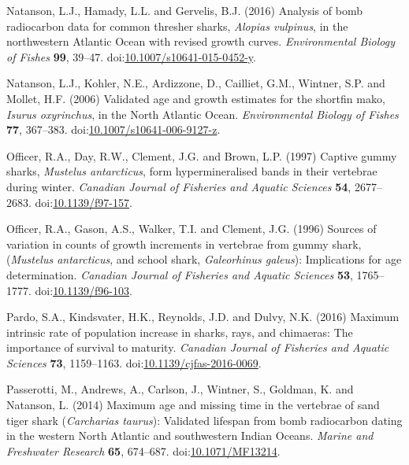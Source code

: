 \documentclass[]{article}
\begin{document}
\hypertarget{ref-natanson_analysis_2016}{}
Natanson, L.J., Hamady, L.L. and Gervelis, B.J. (2016) Analysis of bomb
radiocarbon data for common thresher sharks, \emph{Alopias vulpinus}, in
the northwestern Atlantic Ocean with revised growth curves.
\emph{Environmental Biology of Fishes} \textbf{99}, 39--47.
doi:\href{https://doi.org/10.1007/s10641-015-0452-y}{10.1007/s10641-015-0452-y}.

\hypertarget{ref-natanson_validated_2006}{}
Natanson, L.J., Kohler, N.E., Ardizzone, D., Cailliet, G.M., Wintner,
S.P. and Mollet, H.F. (2006) Validated age and growth estimates for the
shortfin mako, \emph{Isurus oxyrinchus}, in the North Atlantic Ocean.
\emph{Environmental Biology of Fishes} \textbf{77}, 367--383.
doi:\href{https://doi.org/10.1007/s10641-006-9127-z}{10.1007/s10641-006-9127-z}.

\hypertarget{ref-officer_captive_1997}{}
Officer, R.A., Day, R.W., Clement, J.G. and Brown, L.P. (1997) Captive
gummy sharks, \emph{Mustelus antarcticus}, form hypermineralised bands
in their vertebrae during winter. \emph{Canadian Journal of Fisheries
and Aquatic Sciences} \textbf{54}, 2677--2683.
doi:\href{https://doi.org/10.1139/f97-157}{10.1139/f97-157}.

\hypertarget{ref-officer_sources_1996}{}
Officer, R.A., Gason, A.S., Walker, T.I. and Clement, J.G. (1996)
Sources of variation in counts of growth increments in vertebrae from
gummy shark,(\emph{Mustelus antarcticus}, and school shark,
\emph{Galeorhinus galeus}): Implications for age determination.
\emph{Canadian Journal of Fisheries and Aquatic Sciences} \textbf{53},
1765--1777. doi:\href{https://doi.org/10.1139/f96-103}{10.1139/f96-103}.

\hypertarget{ref-pardo_maximum_2016}{}
Pardo, S.A., Kindsvater, H.K., Reynolds, J.D. and Dulvy, N.K. (2016)
Maximum intrinsic rate of population increase in sharks, rays, and
chimaeras: The importance of survival to maturity. \emph{Canadian
Journal of Fisheries and Aquatic Sciences} \textbf{73}, 1159--1163.
doi:\href{https://doi.org/10.1139/cjfas-2016-0069}{10.1139/cjfas-2016-0069}.

\hypertarget{ref-passerotti_maximum_2014}{}
Passerotti, M., Andrews, A., Carlson, J., Wintner, S., Goldman, K. and
Natanson, L. (2014) Maximum age and missing time in the vertebrae of
sand tiger shark (\emph{Carcharias taurus}): Validated lifespan from
bomb radiocarbon dating in the western North Atlantic and southwestern
Indian Oceans. \emph{Marine and Freshwater Research} \textbf{65},
674--687. doi:\href{https://doi.org/10.1071/MF13214}{10.1071/MF13214}.
\end{document}
